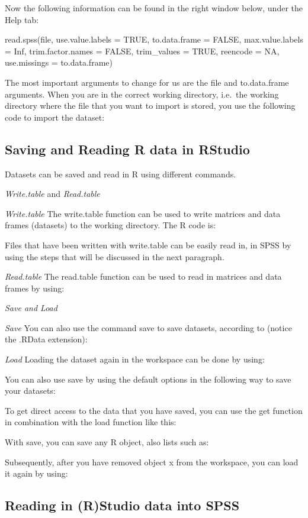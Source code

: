 \documentclass[]{book}
\theoremstyle{definition}
\theoremstyle{definition}
\theoremstyle{definition}
\theoremstyle{remark}
\begin{document}
Now the following information can be found in the right window below,
under the Help tab:

read.spss(file, use.value.labels = TRUE, to.data.frame = FALSE,
max.value.labels = Inf, trim.factor.names = FALSE, trim\_values = TRUE,
reencode = NA, use.missings = to.data.frame)

The most important arguments to change for us are the file and
to.data.frame arguments. When you are in the correct working directory,
i.e.~the working directory where the file that you want to import is
stored, you use the following code to import the dataset:

\subsection{Saving and Reading R data in
RStudio}\label{saving-and-reading-r-data-in-rstudio}

Datasets can be saved and read in R using different commands.

\emph{Write.table} and \emph{Read.table}

\emph{Write.table} The write.table function can be used to write
matrices and data frames (datasets) to the working directory. The R code
is:

Files that have been written with write.table can be easily read in, in
SPSS by using the steps that will be discussed in the next paragraph.

\emph{Read.table} The read.table function can be used to read in
matrices and data frames by using:

\emph{Save and Load}

\emph{Save} You can also use the command save to save datasets,
according to (notice the .RData extension):

\emph{Load} Loading the dataset again in the workspace can be done by
using:

You can also use save by using the default options in the following way
to save your datasets:

To get direct access to the data that you have saved, you can use the
get function in combination with the load function like this:

With save, you can save any R object, also lists such as:

Subsequently, after you have removed object x from the workspace, you
can load it again by using:

\subsection{Reading in (R)Studio data into
SPSS}\label{reading-in-rstudio-data-into-spss}
\end{document}
